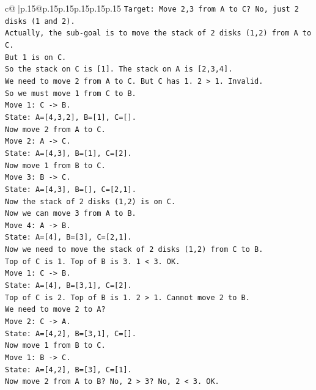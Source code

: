 \documentclass{article}
\begin{document}
{\begin{supertabular}{c@{$\;$}|p{.15\linewidth}@{}p{.15\linewidth}p{.15\linewidth}p{.15\linewidth}p{.15\linewidth}p{.15\linewidth}}
{{{\texttt{Target: Move 2,3 from A to C? No, just 2 disks (1 and 2).} \\
\texttt{Actually, the sub{-}goal is to move the stack of 2 disks (1,2) from A to C.} \\
\texttt{But 1 is on C.} \\
\texttt{So the stack on C is {[}1{]}. The stack on A is {[}2,3,4{]}.} \\
\texttt{We need to move 2 from A to C. But C has 1. 2 > 1. Invalid.} \\
\texttt{So we must move 1 from C to B.} \\
\texttt{Move 1: C {-}> B.} \\
\texttt{State: A={[}4,3,2{]}, B={[}1{]}, C={[}{]}.} \\
\texttt{Now move 2 from A to C.} \\
\texttt{Move 2: A {-}> C.} \\
\texttt{State: A={[}4,3{]}, B={[}1{]}, C={[}2{]}.} \\
\texttt{Now move 1 from B to C.} \\
\texttt{Move 3: B {-}> C.} \\
\texttt{State: A={[}4,3{]}, B={[}{]}, C={[}2,1{]}.} \\
\texttt{Now the stack of 2 disks (1,2) is on C.} \\
\texttt{Now we can move 3 from A to B.} \\
\texttt{Move 4: A {-}> B.} \\
\texttt{State: A={[}4{]}, B={[}3{]}, C={[}2,1{]}.} \\
\texttt{Now we need to move the stack of 2 disks (1,2) from C to B.} \\
\texttt{Top of C is 1. Top of B is 3. 1 < 3. OK.} \\
\texttt{Move 1: C {-}> B.} \\
\texttt{State: A={[}4{]}, B={[}3,1{]}, C={[}2{]}.} \\
\texttt{Top of C is 2. Top of B is 1. 2 > 1. Cannot move 2 to B.} \\
\texttt{We need to move 2 to A?} \\
\texttt{Move 2: C {-}> A.} \\
\texttt{State: A={[}4,2{]}, B={[}3,1{]}, C={[}{]}.} \\
\texttt{Now move 1 from B to C.} \\
\texttt{Move 1: B {-}> C.} \\
\texttt{State: A={[}4,2{]}, B={[}3{]}, C={[}1{]}.} \\
\texttt{Now move 2 from A to B? No, 2 > 3? No, 2 < 3. OK.} \\
}}}
\end{supertabular}}
\end{document}
